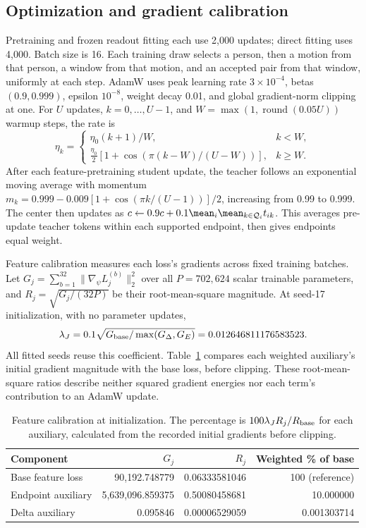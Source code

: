 \subsection{Optimization and gradient calibration}
\label{app:optimization}
Pretraining and frozen readout fitting each use 2,000 updates; direct fitting uses 4,000. Batch size is 16. Each training draw selects a person, then a motion from that person, a window from that motion, and an accepted pair from that window, uniformly at each step. AdamW uses peak learning rate $3\times10^{-4}$, betas $(0.9,0.999)$, epsilon $10^{-8}$, weight decay 0.01, and global gradient-norm clipping at one. For $U$ updates, $k=0,\ldots,U-1$, and $W=\max(1,\operatorname{round}(0.05U))$ warmup steps, the rate is
\begin{equation}
\eta_k=\begin{cases}
\eta_0(k+1)/W,&k<W,\\
\frac{\eta_0}{2}[1+\cos(\pi(k-W)/(U-W))],&k\ge W.
\end{cases}
\end{equation}
After each feature-pretraining student update, the teacher follows an exponential moving average with momentum
$m_k=0.999-0.009[1+\cos(\pi k/(U-1))]/2$, increasing from 0.99 to 0.999. The center then updates as $c\leftarrow0.9c+0.1\mean_i\mean_{k\in\mathcal Q_i}t_{ik}$. This averages pre-update teacher tokens within each supported endpoint, then gives endpoints equal weight.

Feature calibration measures each loss's gradients across fixed training batches. Let $G_j=\sum_{b=1}^{32}\|\nabla_\psi L_j^{(b)}\|_2^2$ over all $P=702{,}624$ scalar trainable parameters, and $R_j=\sqrt{G_j/(32P)}$ be their root-mean-square magnitude. At seed-17 initialization, with no parameter updates,
\begin{equation}
\lambda_J=0.1\sqrt{G_{\rm base}/\max(G_\Delta,G_E)}=0.012646811176583523.
\end{equation}
All fitted seeds reuse this coefficient. Table~\ref{tab:calibration} compares each weighted auxiliary's initial gradient magnitude with the base loss, before clipping. These root-mean-square ratios describe neither squared gradient energies nor each term's contribution to an AdamW update.

\begin{table}[h]\centering\small
\caption{Feature calibration at initialization. The percentage is $100\lambda_J R_j/R_{\rm base}$ for each auxiliary, calculated from the recorded initial gradients before clipping.}
\label{tab:calibration}
\begin{tabular}{lrrr}\toprule
Component & $G_j$ & $R_j$ & Weighted \% of base \\\midrule
Base feature loss &90,192.748779&0.06333581046&100 (reference)\\
Endpoint auxiliary &5,639,096.859375&0.50080458681&10.000000\\
Delta auxiliary &0.095846&0.00006529059&0.001303714\\\bottomrule
\end{tabular}
\end{table}

